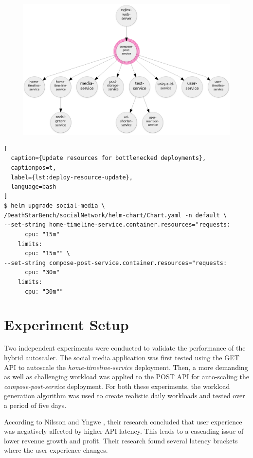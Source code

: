 \begin{figure}[htb]
\begin{minipage}{0.75\linewidth}
        \includegraphics[width=1.0\linewidth]{Figures/Compose-Post-POST-Trace.png}
    \end{minipage}
\end{figure}

\begin{lstlisting}[
  caption={Update resources for bottlenecked deployments},
  captionpos=t,
  label={lst:deploy-resource-update},
  language=bash
]
$ helm upgrade social-media \
/DeathStarBench/socialNetwork/helm-chart/Chart.yaml -n default \
--set-string home-timeline-service.container.resources="requests: 
      cpu: "15m"
    limits:
      cpu: "15m"" \
--set-string compose-post-service.container.resources="requests: 
      cpu: "30m"
    limits:
      cpu: "30m""
\end{lstlisting}

\section{Experiment Setup}
\label{sec:ch6-exp-setup}

Two independent experiments were conducted to validate the performance of the hybrid autoscaler. The social media application was first tested using the GET API to autoscale the \textit{home-timeline-service} deployment. Then, a more demanding as well as challenging workload was applied to the POST API for auto-scaling the \textit{compose-post-service} deployment. For both these experiments, the workload generation algorithm was used to create realistic daily workloads and tested over a period of five days.

According to Nilsson and Yngwe \cite{nilsson2022api}, their research concluded that user experience was negatively affected by higher API latency. This leads to a cascading issue of lower revenue growth and profit. Their research found several latency brackets where the user experience changes.

